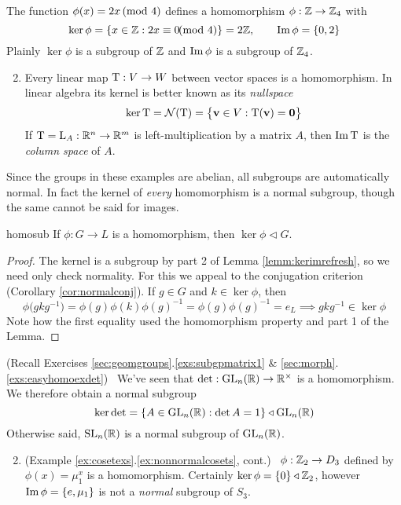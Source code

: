 \begin{examples}{}{}
	\exstart The function $\phi(x)=2x\negthickspace\pmod 4$ defines a homomorphism $\phi:\mathbb{Z}\to\mathbb{Z}_4$ with
	\[
		\ker\phi=\{x\in\mathbb{Z}:2x\equiv 0\negthickspace\negthickspace\pmod 4\}=2\mathbb{Z},
		\qquad
		\operatorname{Im}\phi=\{0,2\}
	\]
	Plainly $\ker\phi$ is a subgroup of $\mathbb{Z}$ and $\operatorname{Im}\phi$ is a subgroup of $\mathbb{Z}_4$.
	\begin{enumerate}\setcounter{enumi}{1}
	  \item Every linear map $\mathrm{T}:V\to W$ between vector spaces is a homomorphism. In linear algebra its kernel is better known as its \emph{nullspace}
		\[
			\ker\mathrm{T}=\mathcal N(\mathrm{T})=\bigl\{{\mathbf{v}}\in V:\mathrm{T}({\mathbf{v}})=\mathbf{0}\bigr\}
		\]
		If $\mathrm{T}=\mathrm{L}_A:\mathbb{R}^n\to \mathbb{R}^m$ is left-multiplication by a matrix $A$, then $\operatorname{Im}\mathrm{T}$ is the \emph{column space} of $A$.
	\end{enumerate}
\end{examples}


Since the groups in these examples are abelian, all subgroups are automatically normal. In fact the kernel of \emph{every} homomorphism is a normal subgroup, though the same cannot be said for images.

\begin{lemm}{}{homosub}
	If $\phi:G\to L$ is a homomorphism, then $\ker\phi\triangleleft G$.
\end{lemm}


\begin{proof}
	The kernel is a subgroup by part 2 of Lemma \ref{lemm:kerimrefresh}, so we need only check normality. For this we appeal to the conjugation criterion (Corollary \ref{cor:normalconj}). If $g\in G$ and $k\in\ker\phi$, then
	\[
		\phi\bigl(gk g^{-1}\bigr) =\phi(g)\phi(k)\phi(g)^{-1}
	  =\phi(g)\phi(g)^{-1} =e_L
	  \implies gk g^{-1}\in\ker\phi
	\]
	Note how the first equality used the homomorphism property and part 1 of the Lemma.
\end{proof}


\goodbreak


\begin{examples}{}{}
	\exstart (Recall Exercises \ref*{sec:geomgroups}.\ref{exs:subgpmatrix1} \& \ref*{sec:morph}.\ref{exs:easyhomoexdet}) \ We've seen that $\det:\mathrm{GL}_n(\mathbb{R})\to\mathbb{R}^\times$ is a homomorphism. We therefore obtain a normal subgroup
	\[
		\ker\det=\{A\in\mathrm{GL}_n(\mathbb{R}):\det A=1\}
		\triangleleft\mathrm{GL}_n(\mathbb{R})
	\]
	Otherwise said, $\mathrm{SL}_n(\mathbb{R})$ is a normal subgroup of $\mathrm{GL}_n(\mathbb{R})$.
	\begin{enumerate}\setcounter{enumi}{1}
  	\item (Example \ref*{ex:cosetexs}.\ref{ex:nonnormalcosets}, cont.) \ $\phi:\mathbb{Z}_2\to D_3$ defined by $\phi(x)=\mu_1^x$ is a homomorphism. Certainly $\ker\phi=\{0\}\triangleleft\mathbb{Z}_2$, however $\operatorname{Im}\phi=\{e,\mu_1\}$ is not a \emph{normal} subgroup of $S_3$.
	\end{enumerate}
\end{examples}


